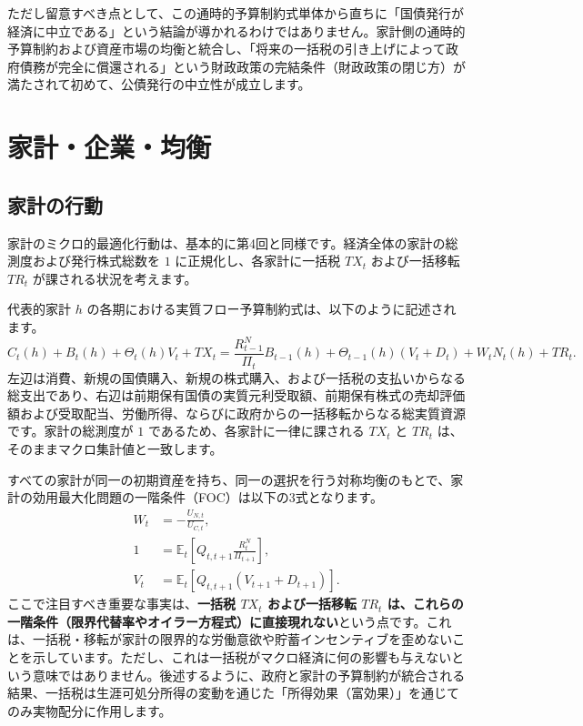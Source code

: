 \documentclass[
  japanese,
  lualatex,
  ja=standard,
  12pt,
  a4paper]{ltjsarticle}
\begin{document}
ただし留意すべき点として、この通時的予算制約式単体から直ちに「国債発行が経済に中立である」という結論が導かれるわけではありません。家計側の通時的予算制約および資産市場の均衡と統合し、「将来の一括税の引き上げによって政府債務が完全に償還される」という財政政策の完結条件（財政政策の閉じ方）が満たされて初めて、公債発行の中立性が成立します。

\section{家計・企業・均衡}\label{ux5bb6ux8a08ux4f01ux696dux5747ux8861}

\subsection{家計の行動}\label{ux5bb6ux8a08ux306eux884cux52d5}

家計のミクロ的最適化行動は、基本的に第4回と同様です。経済全体の家計の総測度および発行株式総数を
\(1\) に正規化し、各家計に一括税 \(TX_t\) および一括移転 \(TR_t\)
が課される状況を考えます。

代表的家計 \(h\)
の各期における実質フロー予算制約式は、以下のように記述されます。 \[
C_t(h) + B_t(h) + \Theta_t(h) V_t + TX_t = \frac{R_{t-1}^N}{\Pi_t} B_{t-1}(h) + \Theta_{t-1}(h) (V_t + D_t) + W_t N_t(h) + TR_t.
\]
左辺は消費、新規の国債購入、新規の株式購入、および一括税の支払いからなる総支出であり、右辺は前期保有国債の実質元利受取額、前期保有株式の売却評価額および受取配当、労働所得、ならびに政府からの一括移転からなる総実質資源です。家計の総測度が
\(1\) であるため、各家計に一律に課される \(TX_t\) と \(TR_t\)
は、そのままマクロ集計値と一致します。

すべての家計が同一の初期資産を持ち、同一の選択を行う対称均衡のもとで、家計の効用最大化問題の一階条件（FOC）は以下の3式となります。
\[
\begin{aligned}
W_t &= -\frac{U_{N,t}}{U_{C,t}},\\
1 &= \mathbb{E}_t \left[ Q_{t,t+1} \frac{R_t^N}{\Pi_{t+1}} \right],\\
V_t &= \mathbb{E}_t \left[ Q_{t,t+1} (V_{t+1} + D_{t+1}) \right].
\end{aligned}
\] ここで注目すべき重要な事実は、\textbf{一括税 \(TX_t\) および一括移転
\(TR_t\)
は、これらの一階条件（限界代替率やオイラー方程式）に直接現れない}という点です。これは、一括税・移転が家計の限界的な労働意欲や貯蓄インセンティブを歪めないことを示しています。ただし、これは一括税がマクロ経済に何の影響も与えないという意味ではありません。後述するように、政府と家計の予算制約が統合される結果、一括税は生涯可処分所得の変動を通じた「所得効果（富効果）」を通じてのみ実物配分に作用します。
\end{document}
